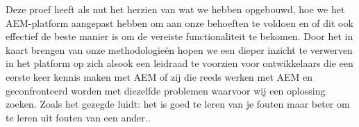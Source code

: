 \documentclass{article}
\begin{document}
	\par
	Deze proef heeft als nut het herzien van wat we hebben opgebouwd, hoe we het AEM-platform aangepast hebben om aan onze behoeften te voldoen en of dit ook effectief de beste manier is om de vereiste functionaliteit te bekomen. 
	Door het in kaart brengen van onze methodologieën hopen we een dieper inzicht te verwerven in het platform op zich alsook een leidraad te voorzien voor ontwikkelaars die een eerste keer kennis maken met AEM of zij die reeds werken met AEM en geconfronteerd worden met diezelfde problemen waarvoor wij een oplossing zoeken. 
	Zoals het gezegde luidt: het is goed te leren van je fouten maar beter om te leren uit fouten van een ander..
\end{document}
